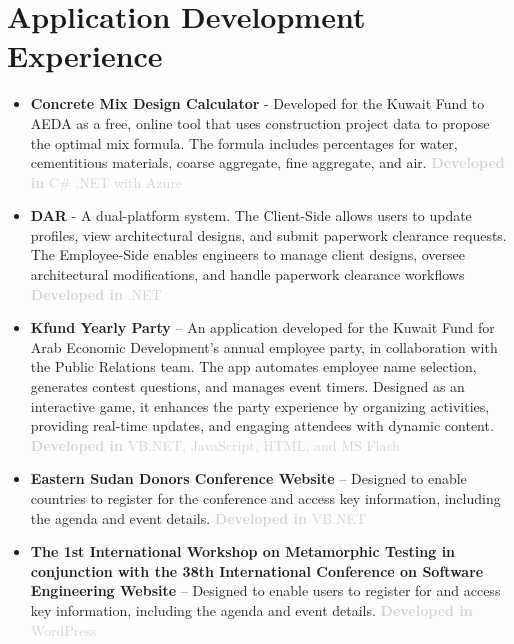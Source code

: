 \documentclass[11pt]{article}
\begin{document}
\section{Application Development Experience} 
        \begin{itemize} 
        \label{sec: MixDesign} 
        \item \textbf{Concrete Mix Design Calculator}  - Developed for the Kuwait Fund to AEDA as a free, online tool that uses construction project data to propose the optimal mix formula. The formula includes percentages for water, cementitious materials, coarse aggregate, fine aggregate, and air. \textcolor{lightgray} { \textbf{Developed in} C\# .NET with Azure    }    \label{sec: DARMEKW-C} \label{sec: DARMEKW-S}
        \vspace{0.8em} %
          \item \textbf{DAR} - A dual-platform system. The Client-Side allows users to update profiles, view architectural designs, and submit paperwork clearance requests. The Employee-Side enables engineers to manage client designs, oversee architectural modifications, and handle paperwork clearance workflows  \textcolor{lightgray} { \textbf{Developed in}  .NET    } 
          \vspace{0.8em} %
              \item \label{sec: Kfund-Party} \textbf{Kfund Yearly Party} – An application developed for the Kuwait Fund for Arab Economic Development’s annual employee party, in collaboration with the Public Relations team. The app automates employee name selection, generates contest questions, and manages event timers. Designed as an interactive game, it enhances the party experience by organizing activities, providing real-time updates, and engaging attendees with dynamic content.  \textcolor{lightgray} { \textbf{Developed in}  VB.NET, JavaScript, HTML, and MS Flash  }  
  \vspace{0.8em} %
               \item \label{sec: Kfund-sudan}  \textbf{Eastern Sudan Donors Conference Website} – Designed to enable countries to register for the conference and access key information, including the agenda and event details. \textcolor{lightgray} { \textbf{Developed in}  VB.NET } 
  \vspace{0.8em} %
               \item \label{sec: Kfund-MET1}  \textbf{The 1st International Workshop on Metamorphic Testing in conjunction with the 38th International Conference on Software Engineering Website} – Designed to enable users to register for and access key information, including the agenda and event details. \textcolor{lightgray} { \textbf{Developed in}  WordPress} {\href{https://www.cs.montana.edu/met16/}{\color{icnclr} \faGlobe[regular] }}


\end{itemize}
\end{document}
